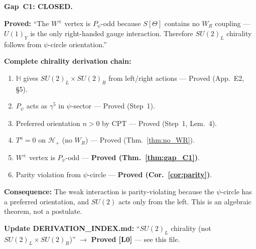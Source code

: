 \documentclass[12pt,a4paper]{article}
\theoremstyle{definition}
\theoremstyle{remark}
\begin{document}
\begin{resultbox}
\textbf{Gap~C1: CLOSED.}

\textbf{Proved:} ``The $W^\pm$ vertex is $P_\psi$-odd because $S[\Theta]$
contains no $W_R$ coupling --- $U(1)_Y$ is the only right-handed gauge
interaction.  Therefore $SU(2)_L$ chirality follows from $\psi$-circle
orientation.''

\medskip
\textbf{Complete chirality derivation chain:}
\begin{enumerate}
  \item $\mathbb{H}$ gives $SU(2)_L\times SU(2)_R$ from left/right actions
        --- Proved (App.~E2, §5).
  \item $P_\psi$ acts as $\gamma^5$ in $\psi$-sector --- Proved (Step~1).
  \item Preferred orientation $n>0$ by CPT --- Proved (Step~1, Lem.~4).
  \item $T^a = 0$ on $\mathcal{H}_+$ (no $W_R$) --- Proved (Thm.~\ref{thm:no_WR}).
  \item $W^\pm$ vertex is $P_\psi$-odd --- \textbf{Proved (Thm.~\ref{thm:gap_C1})}.
  \item Parity violation from $\psi$-circle --- \textbf{Proved (Cor.~\ref{cor:parity})}.
\end{enumerate}

\textbf{Consequence:} The weak interaction is parity-violating because the
$\psi$-circle has a preferred orientation, and $SU(2)$ acts only from
the left.  This is an algebraic theorem, not a postulate.

\textbf{Update DERIVATION\_INDEX.md:} ``$SU(2)_L$ chirality (not $SU(2)_L\times
SU(2)_R$)'' $\to$ \textbf{Proved [L0]} --- see this file.
\end{resultbox}

\ifdefined\INCLUDEMODE
\else
  
\end{document}
